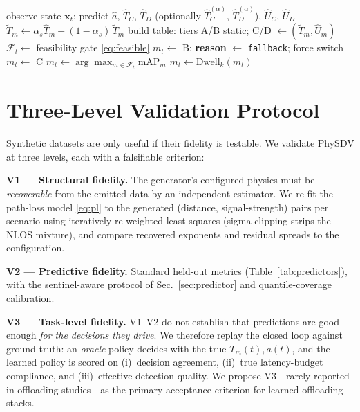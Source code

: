 \documentclass[10pt,conference]{IEEEtran}
\begin{document}
\begin{algorithm}[t]
\caption{PhySDV per-frame offloading decision}
\label{alg:loop}
\begin{algorithmic}[1]
\State observe state $\mathbf{x}_t$; predict $\hat a$, $\hat T_C$, $\hat T_D$
       (optionally $\hat T^{(\alpha)}_C$, $\hat T^{(\alpha)}_D$), $\hat U_C$, $\hat U_D$
\State $\tilde T_m \gets \alpha_s \hat T_m + (1-\alpha_s)\,\tilde T_m$
\State build table: tiers A/B static; C/D $\gets (\tilde T_m, \hat U_m)$
\State $\mathcal{F}_t \gets$ feasibility gate \eqref{eq:feasible}
    \State $m_t \gets$ B; \textbf{reason} $\gets$ \texttt{fallback}; force switch
    \State $m_t \gets$ C 
\Else
    \State $m_t \gets \arg\max_{m \in \mathcal{F}_t} \mathrm{mAP}_m$
\EndIf
\State $m_t \gets \mathrm{Dwell}_k(m_t)$ 
\end{algorithmic}
\end{algorithm}

\section{Three-Level Validation Protocol}\label{sec:validation}

Synthetic datasets are only useful if their fidelity is testable.  We
validate PhySDV at three levels, each with a falsifiable criterion:

\textbf{V1 --- Structural fidelity.}  The generator's configured physics
must be \emph{recoverable} from the emitted data by an independent
estimator.  We re-fit the path-loss model \eqref{eq:pl} to the generated
(distance, signal-strength) pairs per scenario using iteratively
re-weighted least squares (sigma-clipping strips the NLOS mixture), and
compare recovered exponents and residual spreads to the configuration.

\textbf{V2 --- Predictive fidelity.}  Standard held-out metrics
(Table~\ref{tab:predictors}), with the sentinel-aware protocol of
Sec.~\ref{sec:predictor} and quantile-coverage calibration.

\textbf{V3 --- Task-level fidelity.}  V1--V2 do not establish that
predictions are good enough \emph{for the decisions they drive}.  We
therefore replay the closed loop against ground truth: an \emph{oracle}
policy decides with the true $T_m(t), a(t)$, and the learned policy is
scored on (i)~decision agreement, (ii)~true latency-budget compliance,
and (iii)~effective detection quality.  We propose V3---rarely reported
in offloading studies---as the primary acceptance criterion for learned
offloading stacks.
\end{document}
